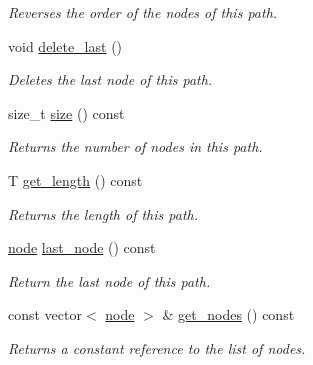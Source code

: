 \begin{DoxyCompactItemize}
\begin{DoxyCompactList}\small\item\em Reverses the order of the nodes of this path. \end{DoxyCompactList}\item 
void \hyperlink{classlgraph_1_1utils_1_1node__path_a3fa7b2c4aca2bc9edfdabf8f7c6c1434}{delete\+\_\+last} ()
\begin{DoxyCompactList}\small\item\em Deletes the last node of this path. \end{DoxyCompactList}\item 
size\+\_\+t \hyperlink{classlgraph_1_1utils_1_1node__path_a8f2480fc8be847b42513c40e86fb3df4}{size} () const 
\begin{DoxyCompactList}\small\item\em Returns the number of nodes in this path. \end{DoxyCompactList}\item 
T \hyperlink{classlgraph_1_1utils_1_1node__path_a9e620f75025d76beecded0d771acbca6}{get\+\_\+length} () const 
\begin{DoxyCompactList}\small\item\em Returns the length of this path. \end{DoxyCompactList}\item 
\hyperlink{namespacelgraph_1_1utils_ab9c6b34241f0b68372c55f34c460e863}{node} \hyperlink{classlgraph_1_1utils_1_1node__path_a74b2525643c2804885a94d7e6fa50ee2}{last\+\_\+node} () const \hypertarget{classlgraph_1_1utils_1_1node__path_a74b2525643c2804885a94d7e6fa50ee2}{}\label{classlgraph_1_1utils_1_1node__path_a74b2525643c2804885a94d7e6fa50ee2}

\begin{DoxyCompactList}\small\item\em Return the last node of this path. \end{DoxyCompactList}\item 
const vector$<$ \hyperlink{namespacelgraph_1_1utils_ab9c6b34241f0b68372c55f34c460e863}{node} $>$ \& \hyperlink{classlgraph_1_1utils_1_1node__path_a9c5553326f2ffaaf6727b90b1363222a}{get\+\_\+nodes} () const \hypertarget{classlgraph_1_1utils_1_1node__path_a9c5553326f2ffaaf6727b90b1363222a}{}\label{classlgraph_1_1utils_1_1node__path_a9c5553326f2ffaaf6727b90b1363222a}

\begin{DoxyCompactList}\small\item\em Returns a constant reference to the list of nodes. \end{DoxyCompactList}\end{DoxyCompactItemize}
